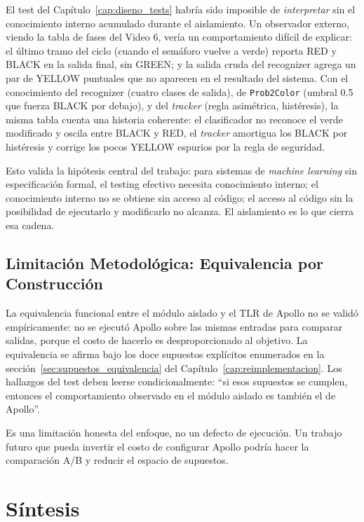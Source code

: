 El test del Capítulo~\ref{cap:diseno_tests} habría sido imposible de \textit{interpretar} sin el conocimiento interno acumulado durante el aislamiento. Un observador externo, viendo la tabla de fases del Video 6, vería un comportamiento difícil de explicar: el último tramo del ciclo (cuando el semáforo vuelve a verde) reporta RED y BLACK en la salida final, sin GREEN; y la salida cruda del recognizer agrega un par de YELLOW puntuales que no aparecen en el resultado del sistema. Con el conocimiento del recognizer (cuatro clases de salida), de \texttt{Prob2Color} (umbral 0.5 que fuerza BLACK por debajo), y del \textit{tracker} (regla asimétrica, histéresis), la misma tabla cuenta una historia coherente: el clasificador no reconoce el verde modificado y oscila entre BLACK y RED, el \textit{tracker} amortigua los BLACK por histéresis y corrige los pocos YELLOW espurios por la regla de seguridad.

Esto valida la hipótesis central del trabajo: para sistemas de \textit{machine learning} sin especificación formal, el testing efectivo necesita conocimiento interno; el conocimiento interno no se obtiene sin acceso al código; el acceso al código sin la posibilidad de ejecutarlo y modificarlo no alcanza. El aislamiento es lo que cierra esa cadena.

\subsection{Limitación Metodológica: Equivalencia por Construcción}

La equivalencia funcional entre el módulo aislado y el TLR de Apollo no se validó empíricamente: no se ejecutó Apollo sobre las mismas entradas para comparar salidas, porque el costo de hacerlo es desproporcionado al objetivo. La equivalencia se afirma bajo los doce supuestos explícitos enumerados en la sección~\ref{sec:supuestos_equivalencia} del Capítulo~\ref{cap:reimplementacion}. Los hallazgos del test deben leerse condicionalmente: ``si esos supuestos se cumplen, entonces el comportamiento observado en el módulo aislado es también el de Apollo''.

Es una limitación honesta del enfoque, no un defecto de ejecución. Un trabajo futuro que pueda invertir el costo de configurar Apollo podría hacer la comparación A/B y reducir el espacio de supuestos.

\section{Síntesis}

